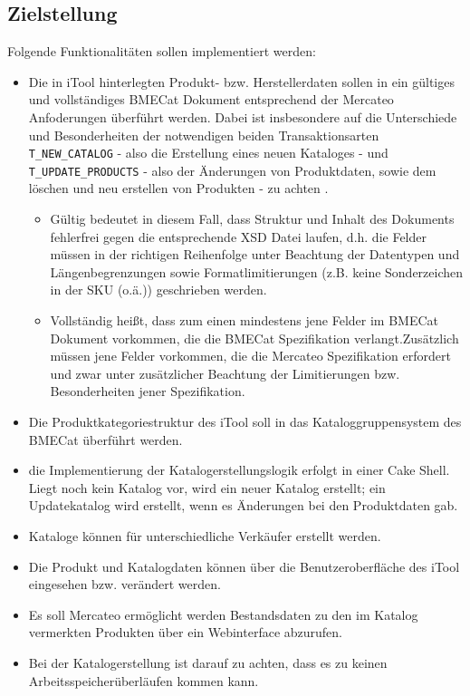 	\subsection{Zielstellung}
	
	Folgende Funktionalitäten sollen implementiert werden:
	
	\begin{itemize}
	\item Die in iTool hinterlegten Produkt- bzw. Herstellerdaten sollen in ein gültiges und vollständiges BMECat Dokument entsprechend der Mercateo Anfoderungen überführt werden. Dabei ist insbesondere auf die Unterschiede und Besonderheiten der notwendigen beiden Transaktionsarten \texttt{T\_NEW\_CATALOG} - also die Erstellung eines neuen Kataloges - und \texttt{T\_UPDATE\_PRODUCTS} - also der Änderungen von Produktdaten, sowie dem löschen und neu erstellen von Produkten - zu achten .
		\begin{itemize}
		\item Gültig bedeutet in diesem Fall, dass Struktur und Inhalt des Dokuments fehlerfrei gegen die entsprechende XSD Datei laufen, d.h. die Felder müssen in der richtigen Reihenfolge unter Beachtung der Datentypen und Längenbegrenzungen sowie Formatlimitierungen (z.B. keine Sonderzeichen in der SKU (o.ä.)) geschrieben werden.
		\item Vollständig heißt, dass zum einen mindestens jene Felder im BMECat Dokument vorkommen, die die BMECat Spezifikation verlangt.Zusätzlich müssen jene Felder vorkommen, die die Mercateo Spezifikation erfordert und zwar unter zusätzlicher Beachtung der Limitierungen bzw. Besonderheiten jener Spezifikation. 	
		\end{itemize}
		
	\item Die Produktkategoriestruktur des iTool soll in das Kataloggruppensystem des BMECat überführt werden.
	\item die Implementierung der Katalogerstellungslogik erfolgt in einer Cake Shell. Liegt noch kein Katalog vor, wird ein neuer Katalog erstellt; ein Updatekatalog wird erstellt, wenn es Änderungen bei den Produktdaten gab. 
	\item Kataloge können für unterschiedliche Verkäufer erstellt werden.
	\item Die Produkt und Katalogdaten können über die Benutzeroberfläche des iTool eingesehen bzw. verändert werden. 
	\item Es soll Mercateo ermöglicht werden Bestandsdaten zu den im Katalog vermerkten Produkten über ein Webinterface abzurufen.
	\item Bei der Katalogerstellung ist darauf zu achten, dass es zu keinen Arbeitsspeicherüberläufen kommen kann.
	\end{itemize}
	
